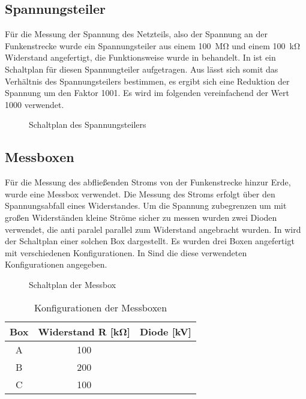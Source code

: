 \subsection{Spannungsteiler}
\label{sec:voltage_divider}
Für die Messung der Spannung des Netzteils, also der Spannung an der Funkenstrecke wurde ein Spannungsteiler aus einem \SI{100}{\mega\ohm} und einem \SI{100}{\kilo\ohm} Widerstand angefertigt, die Funktionsweise wurde in  behandelt. In  ist ein Schaltplan für diesen Spannungteiler aufgetragen. Aus  lässt sich somit das Verhältnis des Spannungsteilers bestimmen, es ergibt sich eine Reduktion der Spannung um den Faktor 1001. Es wird im folgenden vereinfachend der Wert 1000 verwendet.

\begin{figure}[H]
    \centering
    \resizebox{0.5\textwidth}{!}{%
        
    }
    \caption{Schaltplan des Spannungsteilers}
    \label{fig:setup_voltage_divider}
\end{figure}


\subsection{Messboxen}
\label{sec:messbox}
Für die Messung des abfließenden Stroms von der Funkenstrecke hinzur Erde, wurde eine Messbox verwendet. Die Messung des Stroms erfolgt über den Spannungsabfall eines Widerstandes. Um die Spannung zubegrenzen um mit großen Widerständen kleine Ströme sicher zu messen wurden zwei Dioden verwendet, die anti paralel parallel zum Widerstand angebracht wurden. In  wird der Schaltplan einer solchen Box dargestellt. Es wurden drei Boxen angefertigt mit verschiedenen Konfigurationen. In  Sind die diese verwendeten Konfigurationen angegeben.

\begin{figure}[H]
    \centering
    \resizebox{0.5\textwidth}{!}{%
        
    }
    \caption{Schaltplan der Messbox}
    \label{fig:setup_box}
\end{figure}

\begin{table}[H]
\centering
\caption{Konfigurationen der Messboxen}
\label{tab:boxsetup}
\begin{tabular}{S[table-format=2.0] S[table-format=2.1] S[table-format=2.1]}
\toprule
\textbf{Box} & \textbf{Widerstand R [\si{\kilo\ohm}]} & \textbf{Diode [\si{\kilo\volt}]}\\
\midrule
A  & 100 &  \\
B  & 200 & \\
C  & 100 & \\
\bottomrule
\end{tabular}
\end{table}



